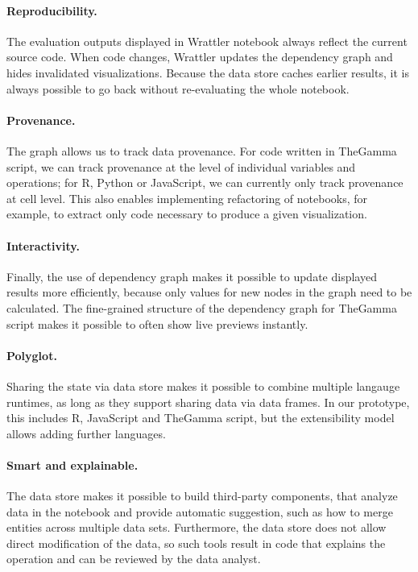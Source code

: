 \documentclass[sigplan]{acmart}\settopmatter{printfolios=true,printccs=false,printacmref=false}
\begin{document}
\paragraph{Reproducibility.} The evaluation outputs displayed in Wrattler notebook always reflect
the current source code. When code changes, Wrattler updates the dependency graph and hides 
invalidated visualizations. Because the data store caches earlier results, it is always possible
to go back without re-evaluating the whole notebook.

\paragraph{Provenance.} The graph allows us to track data provenance. For code written in TheGamma
script, we can track provenance at the level of individual variables and operations; for R, Python
or JavaScript, we can currently only track provenance at cell level. This also enables implementing
refactoring of notebooks, for example, to extract only code necessary to produce a given visualization.

\paragraph{Interactivity.} Finally, the use of dependency graph makes it possible to update 
displayed results more efficiently, because only values for new nodes in the graph need to be
calculated. The fine-grained structure of the dependency graph for TheGamma script makes it 
possible to often show live previews instantly.

\paragraph{Polyglot.} Sharing the state via data store makes it possible to combine multiple
langauge runtimes, as long as they support sharing data via data frames. In our prototype, this
includes R, JavaScript and TheGamma script, but the extensibility model allows adding further
languages.

\paragraph{Smart and explainable.} The data store makes it possible to build third-party components, 
that analyze data in the notebook and provide automatic suggestion, such as how to merge entities
across multiple data sets. Furthermore, the data store does not allow direct modification of the 
data, so such tools result in code that explains the operation and can be reviewed by the data
analyst.
\end{document}
